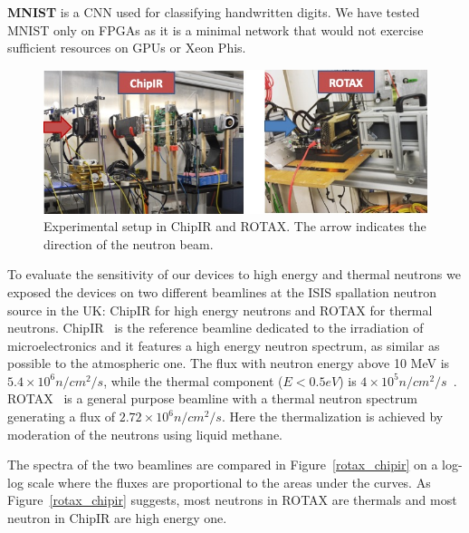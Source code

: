 \textbf{MNIST} is a CNN used for classifying handwritten digits. We have tested MNIST only on FPGAs as it is a minimal network that would not exercise sufficient resources on GPUs or Xeon Phis.


\label{sub_beam_setup}

\begin{figure}[tb]
\centering
\includegraphics[width=0.80\columnwidth]{./figs/setup}
\caption{Experimental setup in ChipIR and ROTAX. The arrow indicates the direction of the neutron beam.}
\label{rad_setup}
\end{figure}

To evaluate the sensitivity of our devices to high energy and thermal neutrons we exposed the devices on two different beamlines at the ISIS spallation neutron source in the UK: ChipIR for high energy neutrons and ROTAX for thermal neutrons.
ChipIR~\cite{cazzaniga2018progress} is the reference beamline dedicated to the irradiation of microelectronics and it features a high energy neutron spectrum, as similar as possible to the atmospheric one. The flux with neutron energy above 10 MeV is $5.4 \times {10}^6 n/{cm}^2/s$, while the thermal component ($E < 0.5 eV$) is $4 \times {10}^5 n/{cm}^2/s$~\cite{chiesa2018measurement}.
ROTAX~\cite{tietze1989rotax} is a general purpose beamline with a thermal neutron spectrum generating a flux of $2.72\times{10}^6 n/{cm}^2/s$. Here the thermalization is achieved by moderation of the neutrons using liquid methane. 

The spectra of the two beamlines are compared in Figure~\ref{rotax_chipir} on a log-log scale where the fluxes are proportional to the areas under the curves. As Figure~\ref{rotax_chipir} suggests, most neutrons in ROTAX are thermals and most neutron in ChipIR are high energy one.

